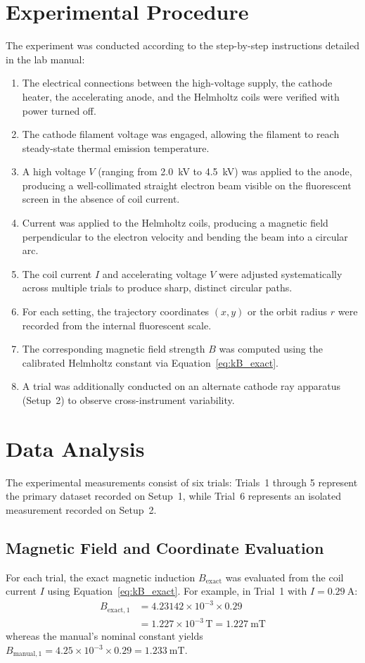 \documentclass[journal]{IEEEtran}
\begin{document}
\section{Experimental Procedure}
The experiment was conducted according to the step-by-step instructions detailed in the lab manual:
\begin{enumerate}
    \item The electrical connections between the high-voltage supply, the cathode heater, the accelerating anode, and the Helmholtz coils were verified with power turned off.
    \item The cathode filament voltage was engaged, allowing the filament to reach steady-state thermal emission temperature.
    \item A high voltage $V$ (ranging from \SI{2.0}{\kilo\volt} to \SI{4.5}{\kilo\volt}) was applied to the anode, producing a well-collimated straight electron beam visible on the fluorescent screen in the absence of coil current.
    \item Current was applied to the Helmholtz coils, producing a magnetic field perpendicular to the electron velocity and bending the beam into a circular arc.
    \item The coil current $I$ and accelerating voltage $V$ were adjusted systematically across multiple trials to produce sharp, distinct circular paths.
    \item For each setting, the trajectory coordinates $(x, y)$ or the orbit radius $r$ were recorded from the internal fluorescent scale.
    \item The corresponding magnetic field strength $B$ was computed using the calibrated Helmholtz constant via Equation~\eqref{eq:kB_exact}.
    \item A trial was additionally conducted on an alternate cathode ray apparatus (Setup~2) to observe cross-instrument variability.
\end{enumerate}

\section{Data Analysis}
The experimental measurements consist of six trials: Trials~1 through 5 represent the primary dataset recorded on Setup~1, while Trial~6 represents an isolated measurement recorded on Setup~2.

\subsection{Magnetic Field and Coordinate Evaluation}
For each trial, the exact magnetic induction $B_{\text{exact}}$ was evaluated from the coil current $I$ using Equation~\eqref{eq:kB_exact}. For example, in Trial~1 with $I = \SI{0.29}{\ampere}$:
\begin{align*}
    B_{\text{exact}, 1} &= 4.23142 \times 10^{-3} \times 0.29 \\
    &= 1.227 \times 10^{-3}\,\mathrm{T} = \SI{1.227}{\milli\tesla}
\end{align*}
whereas the manual's nominal constant yields $B_{\text{manual}, 1} = 4.25 \times 10^{-3} \times 0.29 = \SI{1.233}{\milli\tesla}$.
\end{document}
